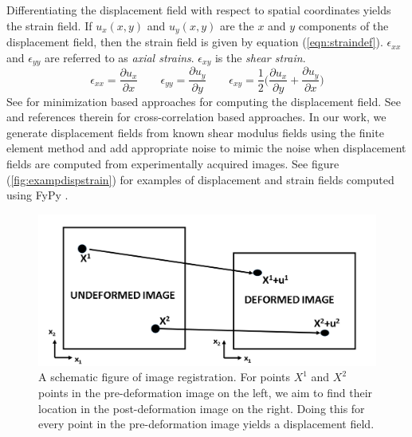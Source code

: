 \documentclass[12pt]{article}
\newcommand{\beq}{\begin{equation}}
\newcommand{\eeq}{\end{equation}}
\newcommand{\pdd}[2]{\frac{\partial{{#1}}}{\partial{#2}}}
\begin{document}
Differentiating the displacement field with respect to spatial coordinates yields the strain field. If $u_x(x,y)$ and $u_{y}(x,y)$ are the $x$ and $y$ components of the displacement field, then the strain field is given by equation (\ref{eqn:straindef}). $\epsilon_{xx}$ and $\epsilon_{yy}$ are referred to as \textit{axial strains}. $\epsilon_{xy}$ is the \textit{shear strain}.
\beq
\label{eqn:straindef}
\epsilon_{xx} = \pdd{u_{x}}{x} \qquad \epsilon_{yy} = \pdd{u_{y}}{y} \qquad \epsilon_{xy} = \frac{1}{2}\Big(\pdd{u_{x}}{y} + \pdd{u_{y}}{x}\Big)
\eeq
See \cite{paper:richards2009,paper:gokhale2004,paper:pellot-barakat2004} for minimization based approaches for computing the displacement field. See \cite{paper:ophir1991,paper:ophir1996,paper:alam1998} and references therein for cross-correlation based approaches. In our work, we generate displacement fields from known shear modulus fields using the finite element method \cite{book:hugheslinear,book:fishbelytschko} and add appropriate noise to mimic the noise when displacement fields are computed from experimentally acquired images. See figure (\ref{fig:exampdispstrain}) for examples of displacement and strain fields computed using FyPy \cite{misc:fypy}.
%
\begin{figure}[!h]
  \centering
  \includegraphics[totalheight=4cm]{Figures/registnew.png}
  \caption{\label{fig:registschematic} A schematic figure of image registration. For points $X^1$ and $X^2$ points in the pre-deformation image on the left, we aim to find their location in the post-deformation image on the right. Doing this for every point in the pre-deformation image yields a displacement field.}
\end{figure}
%
\end{document}
